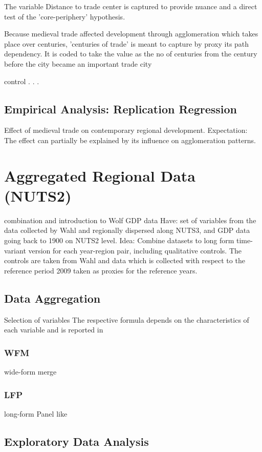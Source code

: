 \documentclass[
12pt, %
english, %
onehalfspacing, %
oneside,
headsepline, %
openany
]{MastersDoctoralThesis} %
\begin{document}
The variable Distance to trade center is captured to provide nuance and a direct test of the 'core-periphery' hypothesis.

Because medieval trade affected development through agglomeration which takes place over centuries, 'centuries of trade' is meant to capture by proxy its path dependency. It is coded to take the value as the no of centuries from the century before the city became an important trade city 

control
.
.
.

\section{Empirical Analysis: Replication Regression}
Effect of medieval trade on contemporary regional development.
Expectation: The effect can partially be explained by its influence on agglomeration patterns.

\newpage

\chapter{Aggregated Regional Data (NUTS2)}
\label{chap:WOLF}
combination and introduction to Wolf GDP data
Have: set of variables from the data collected by Wahl and regionally dispersed along NUTS3, and GDP data going back to 1900 on NUTS2 level.
Idea: Combine datasets to long form time-variant version for each year-region pair, including qualitative controls. The controls are taken from Wahl and data which is collected with respect to the reference period 2009 taken as proxies for the reference years.

\section{Data Aggregation}
\label{sec:DataAgg}
Selection of variables
The respective formula depends on the characteristics of each variable and is reported in 
\subsection{WFM}
wide-form merge

\subsection{LFP}
long-form Panel like

\section{Exploratory Data Analysis}
\end{document}
